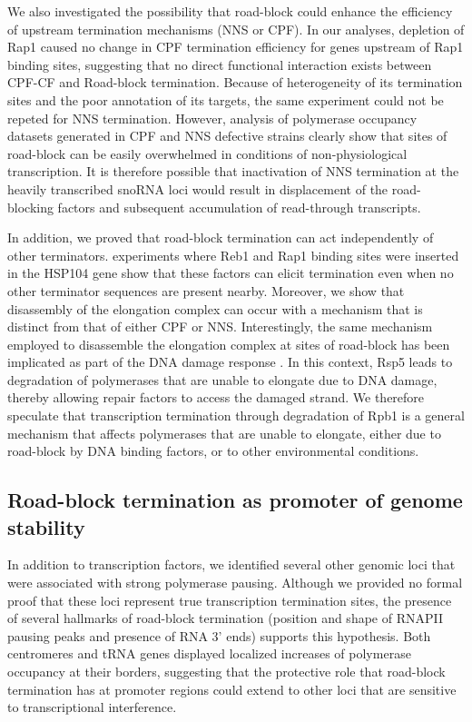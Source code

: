 We also investigated the possibility that road-block could enhance the efficiency of upstream termination mechanisms (NNS or CPF). 
In our analyses, depletion of Rap1 caused no change in CPF termination efficiency for genes upstream of Rap1 binding sites, suggesting that no direct functional interaction exists between CPF-CF and Road-block termination. 
Because of heterogeneity of its termination sites and the poor annotation of its targets, the same experiment could not be repeted for NNS termination.
However, analysis of polymerase occupancy datasets generated in CPF and NNS defective strains clearly show that sites of road-block can be easily overwhelmed in conditions of non-physiological transcription.
It is therefore possible that inactivation of NNS termination at the heavily transcribed snoRNA loci would result in displacement of the road-blocking factors and subsequent accumulation of read-through transcripts. 


In addition, we proved that road-block termination can act independently of other terminators.
\Invivo{} experiments where Reb1 and Rap1 binding sites were inserted in the HSP104 gene show that these factors can elicit termination even when no other terminator sequences are present nearby. 
Moreover, we show that disassembly of the elongation complex can occur with a mechanism that is distinct from that of either CPF or NNS. 
Interestingly, the same mechanism employed to disassemble the elongation complex at sites of road-block has been implicated as part of the DNA damage response \cite{beaudenon:1999:rsp5}. 
In this context, Rsp5 leads to degradation of polymerases that are unable to elongate due to DNA damage, thereby allowing repair factors to access the damaged strand. 
We therefore speculate that transcription termination through degradation of Rpb1 is a general mechanism that affects polymerases that are unable to elongate, either due to road-block by DNA binding factors, or to other environmental conditions.

\subsection{Road-block termination as promoter of genome stability}

In addition to transcription factors, we identified several other genomic loci that were associated with strong polymerase pausing. 
Although we provided no formal proof that these loci represent true transcription termination sites, the presence of several hallmarks of road-block termination (position and shape of RNAPII pausing peaks and presence of RNA 3’ ends) supports this hypothesis. 
Both centromeres and tRNA genes displayed localized increases of polymerase occupancy at their borders, suggesting that the protective role that road-block termination has at promoter regions could extend to other loci that are sensitive to transcriptional interference. 

